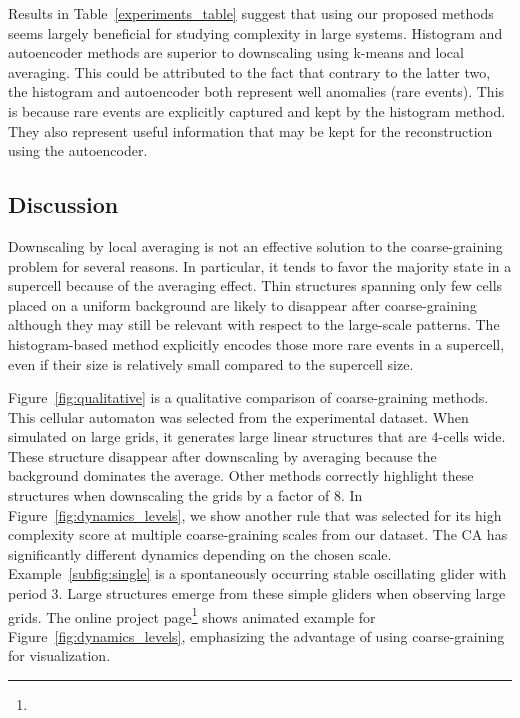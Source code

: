 Results in Table~\ref{experiments_table} suggest that using our proposed methods
seems largely beneficial for studying complexity in large systems.
Histogram and autoencoder methods are superior to downscaling using k-means and
local averaging. This could be attributed to the fact that contrary to the
latter two, the histogram and autoencoder both represent well anomalies (rare
events). This is because rare events are explicitly captured and kept by the
histogram method. They also represent useful information that may be kept for
the reconstruction using the autoencoder.

\subsection{Discussion}\label{sec:discussion}

Downscaling by local averaging is not an effective solution to the
coarse-graining problem for several reasons. In particular, it tends to favor
the majority state in a supercell because of the averaging effect. Thin
structures spanning only few cells placed on a uniform background are likely to
disappear after coarse-graining although they may still be relevant with respect
to the large-scale patterns. The histogram-based method explicitly encodes those
more rare events in a supercell, even if their size is relatively small compared
to the supercell size.

Figure~\ref{fig:qualitative} is a qualitative comparison of coarse-graining
methods. This cellular automaton was selected from the experimental dataset.
When simulated on large grids, it generates large linear structures that are
4-cells wide. These structure disappear after downscaling by averaging because
the background dominates the average. Other methods correctly highlight these
structures when downscaling the grids by a factor of 8. In
Figure~\ref{fig:dynamics_levels}, we show another rule that was selected for its
high complexity score at multiple coarse-graining scales from our dataset. The
CA has significantly different dynamics depending on the chosen scale.
Example~\ref{subfig:single} is a spontaneously occurring stable oscillating
glider with period 3. Large structures emerge from these simple gliders when
observing large grids. The online project page\footnote{\projecturl} shows
animated example for Figure~\ref{fig:dynamics_levels}, emphasizing the advantage
of using coarse-graining for visualization.

